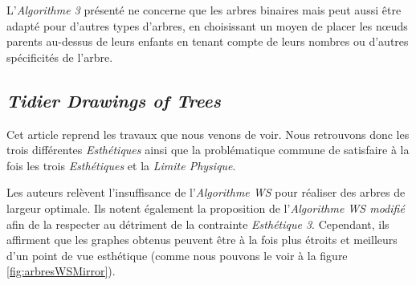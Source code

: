 \documentclass{article}
\begin{document}
    L'\emph{Algorithme 3} présenté ne concerne que les arbres binaires mais peut aussi être adapté pour d'autres types d'arbres, en choisissant un moyen de placer les n\oe{}uds parents au-dessus de leurs enfants en tenant compte de leurs nombres ou d'autres spécificités de l'arbre.

\newpage
  \subsection{\emph{Tidier Drawings of Trees}}

  Cet article \cite{article81} reprend les travaux que nous venons de voir. Nous retrouvons donc les trois différentes \emph{Esthétiques} ainsi que la problématique commune de satisfaire à la fois les trois \emph{Esthétiques} et la \emph{Limite Physique}.

  Les auteurs relèvent l'insuffisance de l'\emph{Algorithme WS} pour réaliser des arbres de largeur optimale. Ils notent également la proposition de l'\emph{Algorithme WS modifié} afin de la respecter au détriment de la contrainte \emph{Esthétique 3}. Cependant, ils affirment que les graphes obtenus peuvent être à la fois plus étroits et meilleurs d'un point de vue esthétique (comme nous pouvons le voir à la figure \ref{fig:arbresWSMirror}).
\end{document}
